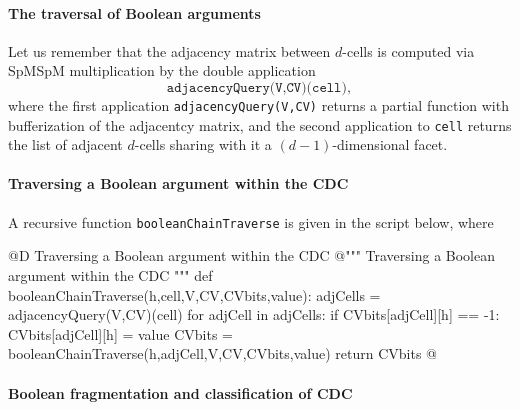 \documentclass[11pt,oneside]{article}	%
\begin{document}
\paragraph{The traversal of Boolean arguments}
Let us remember that the adjacency matrix between $d$-cells is computed via SpMSpM multiplication by the double application 
\[
\texttt{adjacencyQuery(V,CV)(cell)}, 
\] 
where the first application \texttt{adjacencyQuery(V,CV)}
returns a partial function with bufferization of the adjacentcy matrix, and the second application to \texttt{cell} returns the list of adjacent $d$-cells sharing with it a $(d-1)$-dimensional facet.

\paragraph{Traversing a Boolean argument within the CDC}
A recursive function \texttt{booleanChainTraverse} is given in the script below, where 

@D Traversing a Boolean argument within the CDC
@{""" Traversing a Boolean argument within the CDC """
def booleanChainTraverse(h,cell,V,CV,CVbits,value):
	adjCells = adjacencyQuery(V,CV)(cell)
	for adjCell in adjCells: 
		if CVbits[adjCell][h] == -1:
			CVbits[adjCell][h] = value
			CVbits = booleanChainTraverse(h,adjCell,V,CV,CVbits,value)
	return CVbits
@}



\paragraph{Boolean fragmentation and classification of CDC}
\end{document}
